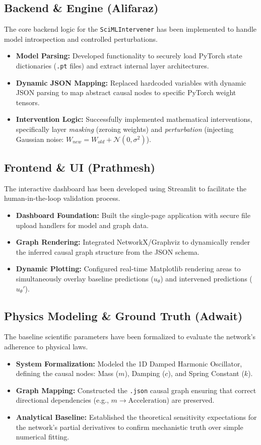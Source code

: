 \documentclass[12pt,singleside,a4paper]{article}
\begin{document}
\subsection{Backend \& Engine (Alifaraz)}
The core backend logic for the \texttt{SciMLIntervener} has been implemented to handle model introspection and controlled perturbations.
\begin{itemize}
    \item \textbf{Model Parsing:} Developed functionality to securely load PyTorch state dictionaries (\texttt{.pt} files) and extract internal layer architectures.
    \item \textbf{Dynamic JSON Mapping:} Replaced hardcoded variables with dynamic JSON parsing to map abstract causal nodes to specific PyTorch weight tensors.
    \item \textbf{Intervention Logic:} Successfully implemented mathematical interventions, specifically layer \textit{masking} (zeroing weights) and \textit{perturbation} (injecting Gaussian noise: $W_{new} = W_{old} + \mathcal{N}(0, \sigma^2)$).
\end{itemize}

\subsection{Frontend \& UI (Prathmesh)}
The interactive dashboard has been developed using Streamlit to facilitate the human-in-the-loop validation process.
\begin{itemize}
    \item \textbf{Dashboard Foundation:} Built the single-page application with secure file upload handlers for model and graph data.
    \item \textbf{Graph Rendering:} Integrated NetworkX/Graphviz to dynamically render the inferred causal graph structure from the JSON schema.
    \item \textbf{Dynamic Plotting:} Configured real-time Matplotlib rendering areas to simultaneously overlay baseline predictions ($u_\theta$) and intervened predictions ($u_{\theta}'$).
\end{itemize}

\subsection{Physics Modeling \& Ground Truth (Adwait)}
The baseline scientific parameters have been formalized to evaluate the network's adherence to physical laws.
\begin{itemize}
    \item \textbf{System Formalization:} Modeled the 1D Damped Harmonic Oscillator, defining the causal nodes: Mass ($m$), Damping ($c$), and Spring Constant ($k$).
    \item \textbf{Graph Mapping:} Constructed the \texttt{.json} causal graph ensuring that correct directional dependencies (e.g., $m \rightarrow \text{Acceleration}$) are preserved.
    \item \textbf{Analytical Baseline:} Established the theoretical sensitivity expectations for the network's partial derivatives to confirm mechanistic truth over simple numerical fitting.
\end{itemize}
\end{document}
